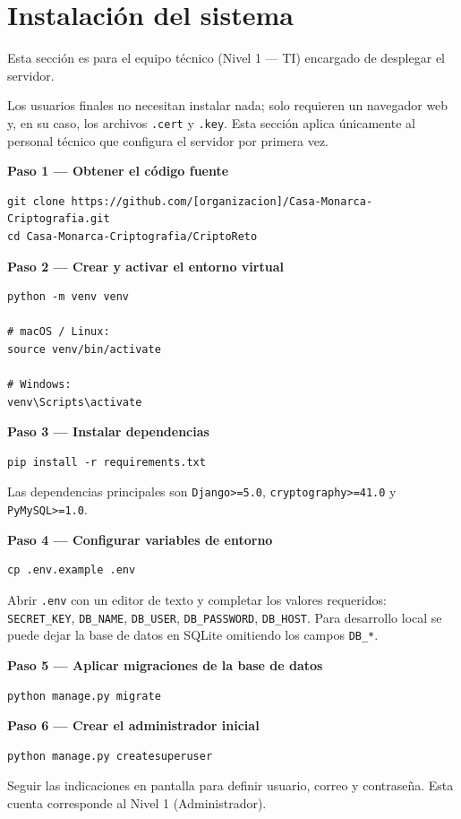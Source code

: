 \documentclass[10pt,letterpaper]{report}
\newcommand{\paso}[2]{\par\medskip\noindent\textbf{Paso #1 — #2}\par\nopagebreak\smallskip}
\begin{document}
\section{Instalación del sistema}

Esta sección es para el equipo técnico (Nivel 1 --- TI) encargado de desplegar el servidor.

\begin{nota}
Los usuarios finales no necesitan instalar nada; solo requieren un navegador web y, en su caso, los archivos \texttt{.cert} y \texttt{.key}. Esta sección aplica únicamente al personal técnico que configura el servidor por primera vez.
\end{nota}

\paso{1}{Obtener el código fuente}
\begin{lstlisting}[style=cmd]
git clone https://github.com/[organizacion]/Casa-Monarca-Criptografia.git
cd Casa-Monarca-Criptografia/CriptoReto
\end{lstlisting}

\paso{2}{Crear y activar el entorno virtual}
\begin{lstlisting}[style=cmd]
python -m venv venv

# macOS / Linux:
source venv/bin/activate

# Windows:
venv\Scripts\activate
\end{lstlisting}

\paso{3}{Instalar dependencias}
\begin{lstlisting}[style=cmd]
pip install -r requirements.txt
\end{lstlisting}
Las dependencias principales son \texttt{Django>=5.0}, \texttt{cryptography>=41.0} y \texttt{PyMySQL>=1.0}.

\paso{4}{Configurar variables de entorno}
\begin{lstlisting}[style=cmd]
cp .env.example .env
\end{lstlisting}
Abrir \texttt{.env} con un editor de texto y completar los valores requeridos: \texttt{SECRET\_KEY}, \texttt{DB\_NAME}, \texttt{DB\_USER}, \texttt{DB\_PASSWORD}, \texttt{DB\_HOST}. Para desarrollo local se puede dejar la base de datos en SQLite omitiendo los campos \texttt{DB\_*}.

\paso{5}{Aplicar migraciones de la base de datos}
\begin{lstlisting}[style=cmd]
python manage.py migrate
\end{lstlisting}

\paso{6}{Crear el administrador inicial}
\begin{lstlisting}[style=cmd]
python manage.py createsuperuser
\end{lstlisting}
Seguir las indicaciones en pantalla para definir usuario, correo y contraseña. Esta cuenta corresponde al Nivel 1 (Administrador).
\end{document}
